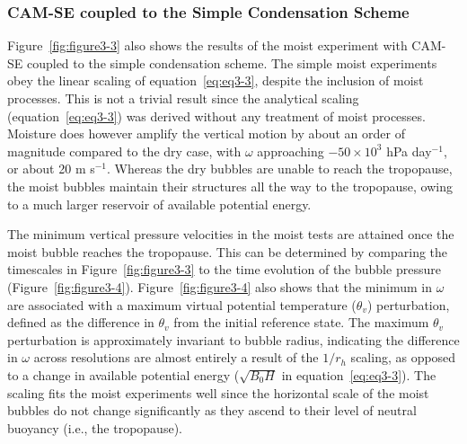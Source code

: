 \subsubsection{CAM-SE coupled to the Simple Condensation Scheme}
Figure~\ref{fig:figure3-3} also shows the results of the moist experiment with CAM-SE coupled to the simple condensation scheme. The simple moist experiments obey the linear scaling of equation~\ref{eq:eq3-3}, despite the inclusion of moist processes. This is not a trivial result since the analytical scaling (equation~\ref{eq:eq3-3}) was derived without any treatment of moist processes. Moisture does however amplify the vertical motion by about an order of magnitude compared to the dry case, with $\omega$ approaching $-50 \times 10^3$ hPa day$^{-1}$, or about 20 m s$^{-1}$. Whereas the dry bubbles are unable to reach the tropopause, the moist bubbles maintain their structures all the way to the tropopause, owing to a much larger reservoir of available potential energy.
 
The minimum vertical pressure velocities in the moist tests are attained once the moist bubble reaches the tropopause. This can be determined by comparing the timescales in Figure~\ref{fig:figure3-3} to the time evolution of the bubble pressure (Figure~\ref{fig:figure3-4}). Figure~\ref{fig:figure3-4} also shows that the minimum in $\omega$ are associated with a maximum virtual potential temperature ($\theta_v$) perturbation, defined as the difference in $\theta_v$ from the initial reference state. The maximum $\theta_v$ perturbation is approximately invariant to bubble radius, indicating the difference in $\omega$ across resolutions are almost entirely a result of the $1/r_h$ scaling, as opposed to a change in available potential energy ($\sqrt{B_0 H}$ in equation~\ref{eq:eq3-3}). The scaling fits the moist experiments well since the horizontal scale of the moist bubbles do not change significantly as they ascend to their level of neutral buoyancy (i.e., the tropopause).


